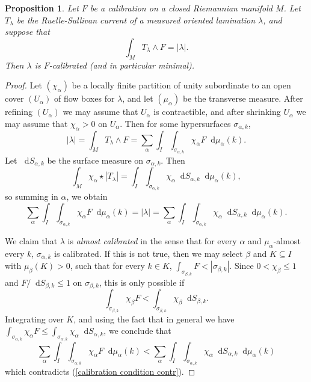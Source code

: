 \documentclass[reqno,11pt]{amsart}
\newcommand*\dif{\mathop{}\!\mathrm{d}}
\newcommand{\dfn}[1]{\emph{#1}\index{#1}}
\newtheorem{proposition}[theorem]{Proposition}
\theoremstyle{definition}
\numberwithin{equation}{section}
\begin{document}
\begin{proposition}\label{calibration condition}
Let $F$ be a calibration on a closed Riemannian manifold $M$.
Let $T_\lambda$ be the Ruelle-Sullivan current of a measured oriented lamination $\lambda$, and suppose that 
\begin{equation}\label{calibration by Ruelle Sullivan}
\int_M T_\lambda \wedge F = |\lambda|.
\end{equation}
Then $\lambda$ is $F$-calibrated (and in particular minimal).
\end{proposition}
\begin{proof}
Let $(\chi_\alpha)$ be a locally finite partition of unity subordinate to an open cover $(U_\alpha)$ of flow boxes for $\lambda$, and let $(\mu_\alpha)$ be the transverse measure.
After refining $(U_\alpha)$ we may assume that $U_\alpha$ is contractible, and after shrinking $U_\alpha$ we may assume that $\chi_\alpha > 0$ on $U_\alpha$.
Then for some hypersurfaces $\sigma_{\alpha,k}$,
$$|\lambda| = \int_M T_\lambda \wedge F = \sum_\alpha \int_I \int_{\sigma_{\alpha,k}} \chi_\alpha F \dif \mu_\alpha(k).$$
Let $\dif S_{\alpha,k}$ be the surface measure on $\sigma_{\alpha,k}$. Then
$$\int_M \chi_\alpha \star |T_\lambda| = \int_I \int_{\sigma_{\alpha,k}} \chi_\alpha \dif S_{\alpha,k} \dif \mu_\alpha(k),$$
so summing in $\alpha$, we obtain 
\begin{equation}\label{calibration condition contr}
\sum_\alpha \int_I \int_{\sigma_{\alpha,k}} \chi_\alpha F \dif \mu_\alpha(k) = |\lambda| = \sum_\alpha \int_I \int_{\sigma_{\alpha,k}} \chi_\alpha \dif S_{\alpha,k} \dif \mu_\alpha(k).
\end{equation}

We claim that $\lambda$ is \dfn{almost calibrated} in the sense that for every $\alpha$ and $\mu_\alpha$-almost every $k$, $\sigma_{\alpha, k}$ is calibrated.
If this is not true, then we may select $\beta$ and $K \subseteq I$ with $\mu_\beta(K) > 0$, such that for every $k \in K$, $\int_{\sigma_{\beta, k}} F < |\sigma_{\beta, k}|$.
Since $0 < \chi_\beta \leq 1$ and $F/\dif S_{\beta, k} \leq 1$ on $\sigma_{\beta, k}$, this is only possible if 
$$\int_{\sigma_{\beta, k}} \chi_\beta F < \int_{\sigma_{\beta, k}} \chi_\beta \dif S_{\beta, k}.$$
Integrating over $K$, and using the fact that in general we have $\int_{\sigma_{\alpha, k}} \chi_\alpha F \leq \int_{\sigma_{\alpha, k}} \chi_\alpha \dif S_{\alpha, k}$, we conclude that 
$$\sum_\alpha \int_I \int_{\sigma_{\alpha, k}} \chi_\alpha F \dif \mu_\alpha(k) < \sum_\alpha \int_I \int_{\sigma_{\alpha, k}} \chi_\alpha \dif S_{\alpha, k} \dif \mu_\alpha(k)$$
which contradicts (\ref{calibration condition contr}).


\end{proof}
\end{document}

